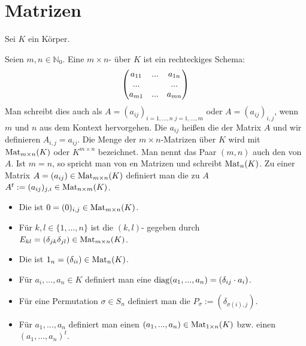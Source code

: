 \section{Matrizen}

Sei $K$ ein Körper.

\begin{definition}[Matrix]
	Seien $m,n \in \mathbb N_0$. Eine $m\times n$- über $K$ ist ein rechteckiges 
	Schema:
	\begin{align}
		\begin{pmatrix}
		a_{11} & ... & a_{1n}\\
		... &  & ...\\
		a_{m1} & ... & a_{mn}\\
		\end{pmatrix}\notag
	\end{align}
	Man schreibt dies auch als $A=(a_{ij})_{i=1,...,n \; j=1,...,m}$ oder $A=(a_{ij})_{i,j}$, wenn $m$ und $n$ 
	aus dem Kontext hervorgehen. Die $a_{ij}$ heißen die  der Matrix $A$ und wir definieren $A_{i,j}=
	a_{ij}$. Die Menge der $m\times n$-Matrizen über $K$ wird mit $\operatorname{Mat}_{m\times n}(K)$ oder $K^{m\times n}$ 
	bezeichnet. Man nennt das Paar $(m,n)$ auch den  von $A$. Ist $m=n$, so spricht man von en 
	Matrizen und schreibt $\operatorname{Mat}_n(K)$. Zu einer Matrix $A=(a_{ij}) \in \operatorname{Mat}_{m\times n}(K)$ definiert man die zu $A$ 
	 $A^t := (a_{ij})_{j,i} \in \operatorname{Mat}_{n\times m}(K)$.
\end{definition}

\begin{example}
	\begin{itemize}
		\item Die  ist $0=(0)_{i,j} \in \operatorname{Mat}_{m\times n}(K)$.
		\item Für $k,l \in \{1,...,n\}$ ist die $(k,l)$- gegeben durch $E_{kl}=(\delta_{jk}\delta_{jl})\in 
		\operatorname{Mat}_{m\times n}(K)$.
		\item Die  ist $1_n=(\delta_{ii})\in \operatorname{Mat}_n(K)$.
		\item Für $a_i,...,a_n \in K$ definiert man eine  $\operatorname{diag}(a_1,...,a_n)=(\delta_{ij}\cdot a_i)$.
		\item Für eine Permutation $\sigma\in S_n$ definiert man die  $P_\sigma := (\delta_{\sigma
			(i),j})$.
		\item Für $a_1,...,a_n$ definiert man einen  $(a_1,...,a_n)\in \operatorname{Mat}_{1\times n}(K)$ bzw. einen 
		 $(a_1,...,a_n)^t$.
	\end{itemize}
\end{example}

